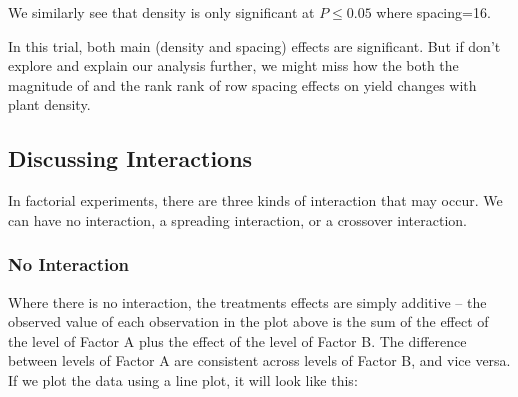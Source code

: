 \documentclass[
]{book}
\begin{document}
We similarly see that density is only significant at \(P\le0.05\) where spacing=16.

In this trial, both main (density and spacing) effects are significant. But if don't explore and explain our analysis further, we might miss how the both the magnitude of and the rank rank of row spacing effects on yield changes with plant density.

\hypertarget{discussing-interactions}{%
\subsection{Discussing Interactions}\label{discussing-interactions}}

In factorial experiments, there are three kinds of interaction that may occur. We can have no interaction, a spreading interaction, or a crossover interaction.

\hypertarget{no-interaction}{%
\subsubsection{No Interaction}\label{no-interaction}}

Where there is no interaction, the treatments effects are simply additive -- the observed value of each observation in the plot above is the sum of the effect of the level of Factor A plus the effect of the level of Factor B. The difference between levels of Factor A are consistent across levels of Factor B, and vice versa. If we plot the data using a line plot, it will look like this:
\end{document}
